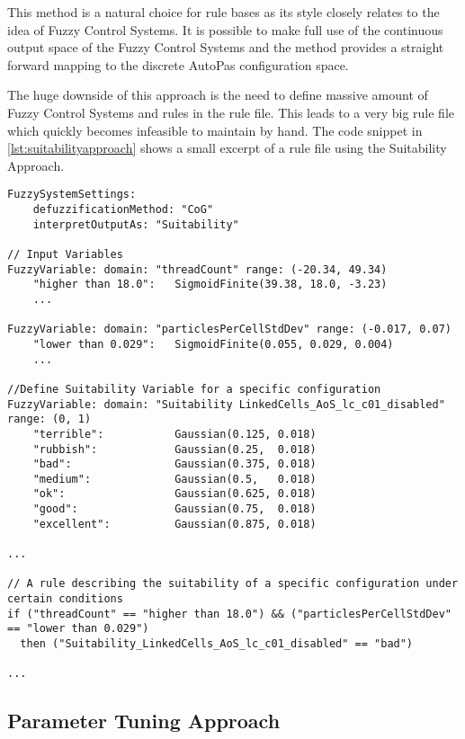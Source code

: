 This method is a natural choice for rule bases as its style closely relates to the idea of Fuzzy Control Systems. It is possible to make full use of the continuous output space of the Fuzzy Control Systems and the method provides a straight forward mapping to the discrete AutoPas configuration space.

The huge downside of this approach is the need to define massive amount of Fuzzy Control Systems and rules in the rule file. This leads to a very big rule file which quickly becomes infeasible to maintain by hand. The code snippet in \autoref{lst:suitabilityapproach} shows a small excerpt of a rule file using the Suitability Approach.


\begin{lstlisting}[language=FuzzyLanguage, caption={Rule snippet depicting the Suitability Approach}, label={lst:suitabilityapproach}]
FuzzySystemSettings:
    defuzzificationMethod: "CoG"
    interpretOutputAs: "Suitability"

// Input Variables
FuzzyVariable: domain: "threadCount" range: (-20.34, 49.34)
    "higher than 18.0":   SigmoidFinite(39.38, 18.0, -3.23)
    ...

FuzzyVariable: domain: "particlesPerCellStdDev" range: (-0.017, 0.07)
    "lower than 0.029":   SigmoidFinite(0.055, 0.029, 0.004)
    ...

//Define Suitability Variable for a specific configuration
FuzzyVariable: domain: "Suitability LinkedCells_AoS_lc_c01_disabled" range: (0, 1)
    "terrible":           Gaussian(0.125, 0.018)
    "rubbish":            Gaussian(0.25,  0.018)
    "bad":                Gaussian(0.375, 0.018)
    "medium":             Gaussian(0.5,   0.018)
    "ok":                 Gaussian(0.625, 0.018)
    "good":               Gaussian(0.75,  0.018)
    "excellent":          Gaussian(0.875, 0.018)

...

// A rule describing the suitability of a specific configuration under certain conditions
if ("threadCount" == "higher than 18.0") && ("particlesPerCellStdDev" == "lower than 0.029")
  then ("Suitability_LinkedCells_AoS_lc_c01_disabled" == "bad")

...
\end{lstlisting}


\subsection{Parameter Tuning Approach}

